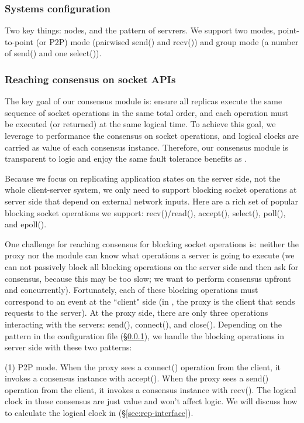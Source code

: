 \subsubsection{Systems configuration} \label{sec:rep-config}

Two key things: nodes, and the pattern of servrers. We support two modes, 
point-to-point (or P2P) mode (pairwised send() and recv()) and group mode (a number of send() 
and one select()).

\subsubsection{Reaching consensus on socket APIs} \label{sec:rep-consensus}
The key goal of our consensus module is: ensure all replicas execute the same 
sequence of socket operations in the same total order, and each operation must 
be executed (or returned) at the same logical time. To achieve this goal, we 
leverage \paxos to performance the consensus on socket operations, and 
logical clocks are carried as value of each consensus instance. Therefore, our 
consensus module is transparent to \paxos logic and enjoy the same fault tolerance 
benefits as \paxos.

Because we focus on replicating application states on the server side, not the 
whole client-server system, we only need to support blocking socket operations at server side
that depend on external network inputs. Here are a rich set of popular 
blocking socket operations we support: recv()/read(), accept(), select(), poll(), and 
epoll().

One challenge for reaching consensus for blocking socket operations is: neither the proxy nor 
the \smt module can know what operations a server is going to execute (we can 
not passively block all blocking operations on the server side and then ask for 
consensus, because this may be too slow; we want to perform consensus upfront 
and concurrently). Fortunately, each of these blocking operations must 
correspond to an event at the ``client" side (in \msmr, the proxy is the client 
that sends requests to the server). At the proxy side, there are only three 
operations interacting with the servers: send(), connect(), and close(). 
Depending on the pattern in the configuration file (\S\ref{sec:rep-config}), we 
handle the blocking operations in server side with these two patterns:

(1) P2P mode. When the proxy sees a connect() operation from the client, it invokes a 
consensus instance with accept(). When the proxy sees a send() operation from the client, it 
invokes a consensus instance with recv(). The logical clock in these consensus 
are just value and won't affect \paxos logic. We will discuss how to calculate 
the logical clock in (\S\ref{sec:rep-interface}).

